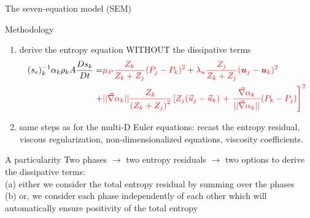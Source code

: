 \documentclass[xcolor=dvipsnames,10pt]{beamer}
\newcommand{\grad}{\vec{\nabla}}
\newcommand{\mbold}[1]{\boldsymbol#1}
\begin{document}
\begin{frame}{The seven-equation model (SEM)}
\begin{block}{Methodology}
\begin{enumerate}
\item derive the entropy equation WITHOUT the dissipative terms
\begin{align}
(s_e)_k^{-1} \alpha_k \rho_k A \frac{D s_k}{Dt} =& \textcolor{red}{\mu_P \frac{Z_k}{Z_k+Z_j} (P_j - P_k)^2} +
\textcolor{red}{ \lambda_u \frac{Z_j}{Z_k+Z_j} (\mbold u_j - \mbold u_k)^2} \nonumber \\ 
+& \textcolor{red}{|| \grad \alpha_k || \frac{Z_k }{\left( Z_k+Z_j \right)^2} \left[ Z_j (\vec{u}_j-\vec{u}_k)\right.+\left. \frac{\grad \alpha_k}{|| \grad \alpha_k ||}(P_k-P_j)\right]^2 }\nonumber
\end{align}
\item same steps as for the multi-D Euler equations: recast the entropy residual, viscous regularization, non-dimensionalized equations, viscosity coefficients.
\end{enumerate}
\end{block}
\begin{block}{A particularity}
Two phases $\to$ two entropy residuals $\to$ two options to derive the dissipative terms: \\
(a) either we consider the total entropy residual by summing over the phases \\
(b) or, we consider each phase independently of each other which will automatically ensure positivity of the total entropy \\
\end{block}
\end{frame}
\end{document}
